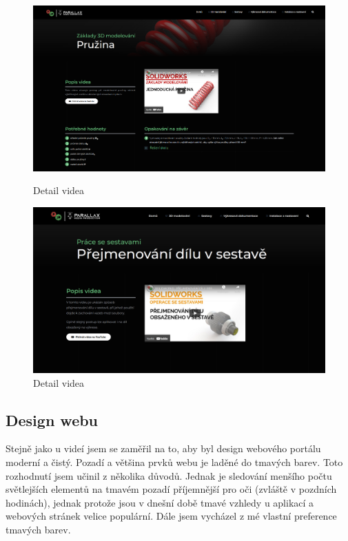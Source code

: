 \begin{figure}[htbp]
    \centering
    \begin{minipage}[b]{0.45\textwidth}
        \centering
        \includegraphics[width=1\textwidth]{img/020/web/web-3D.png}
        \caption{Detail videa}
        \label{fig:p3dportal-3D}
    \end{minipage}
    \qquad
    \begin{minipage}[b]{0.45\textwidth}
        \centering
        \includegraphics[width=1\textwidth]{img/020/web/web-assembly.png}
        \caption{Detail videa}
        \label{fig:p3dportal-assembly}
    \end{minipage}
\end{figure}

\subsection{Design webu}
Stejně jako u videí jsem se zaměřil na to, aby byl design webového portálu moderní a čistý.
Pozadí a většina prvků webu je laděné do tmavých barev.
Toto rozhodnutí jsem učinil z několika důvodů.
Jednak je sledování menšího počtu světlejších elementů na tmavém pozadí příjemnější pro oči (zvláště v pozdních hodinách), jednak protože jsou v dnešní době tmavé vzhledy u aplikací a webových stránek velice populární.
Dále jsem vycházel z mé vlastní preference tmavých barev.


